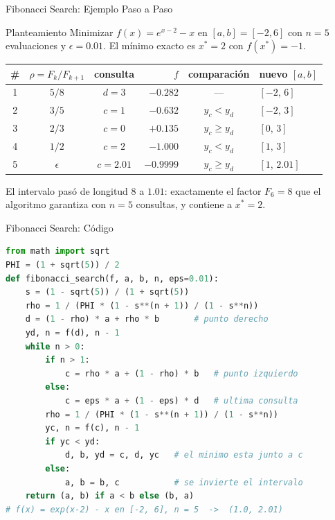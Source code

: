 \begin{frame}{Fibonacci Search: Ejemplo Paso a Paso}
    \begin{exampleblock}{Planteamiento}
        \small
        Minimizar $f(x)=e^{x-2}-x$ en $[a,b]=[-2,6]$ con $n=5$ evaluaciones
        y $\epsilon=0.01$. El mínimo exacto es $x^{*}=2$ con $f(x^{*})=-1$.
    \end{exampleblock}

    \vspace{-0.2em}
    \begin{center}
    \scriptsize
    \begin{tabular}{c c c r c l}
        \toprule
        \# & $\rho=F_k/F_{k+1}$ & consulta & $f$ & comparación & nuevo $[a,b]$ \\
        \midrule
        1 & $5/8$ & $d=3$    & $-0.282$ & ---            & $[-2,\,6]$ \\
        2 & $3/5$ & $c=1$    & $-0.632$ & $y_c<y_d$      & $[-2,\,3]$ \\
        3 & $2/3$ & $c=0$    & $+0.135$ & $y_c\ge y_d$   & $[0,\,3]$ \\
        4 & $1/2$ & $c=2$    & $-1.000$ & $y_c<y_d$      & $[1,\,3]$ \\
        5 & $\epsilon$ & $c=2.01$ & $-0.9999$ & $y_c\ge y_d$ & $[1,\,2.01]$ \\
        \bottomrule
    \end{tabular}
    \end{center}

    \footnotesize
    El intervalo pasó de longitud $8$ a $1.01$: exactamente el factor
    $F_{6}=8$ que el algoritmo garantiza con $n=5$ consultas, y contiene a $x^{*}=2$.
\end{frame}

\begin{frame}[fragile]{Fibonacci Search: Código}
\begin{lstlisting}[language=Python]
from math import sqrt
PHI = (1 + sqrt(5)) / 2
def fibonacci_search(f, a, b, n, eps=0.01):
    s = (1 - sqrt(5)) / (1 + sqrt(5))
    rho = 1 / (PHI * (1 - s**(n + 1)) / (1 - s**n))
    d = (1 - rho) * a + rho * b       # punto derecho
    yd, n = f(d), n - 1
    while n > 0:
        if n > 1:
            c = rho * a + (1 - rho) * b   # punto izquierdo
        else:
            c = eps * a + (1 - eps) * d   # ultima consulta
        rho = 1 / (PHI * (1 - s**(n + 1)) / (1 - s**n))
        yc, n = f(c), n - 1
        if yc < yd:
            d, b, yd = c, d, yc   # el minimo esta junto a c
        else:
            a, b = b, c           # se invierte el intervalo
    return (a, b) if a < b else (b, a)
# f(x) = exp(x-2) - x en [-2, 6], n = 5  ->  (1.0, 2.01)
\end{lstlisting}
\end{frame}

